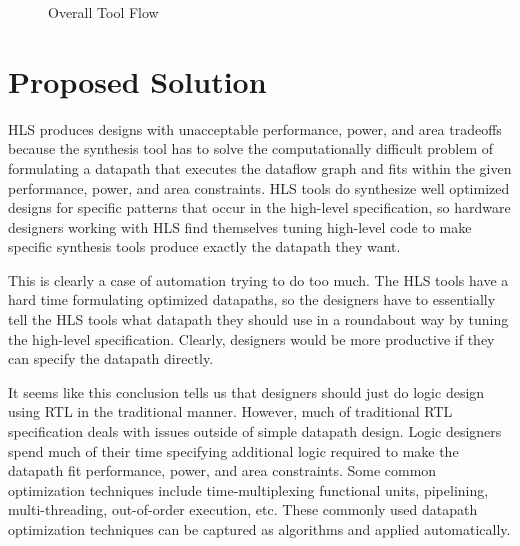\begin{figure}
	\centering
    \caption{Overall Tool Flow}
	\label{fig:workflow}
\end{figure}

\section{Proposed Solution}
HLS produces designs with unacceptable performance, power, and area tradeoffs because the synthesis tool has to solve the computationally difficult problem of formulating a datapath that executes the dataflow graph and fits within the given performance, power, and area constraints. HLS tools do synthesize well optimized designs for specific patterns that occur in the high-level specification, so hardware designers working with HLS find themselves tuning high-level code to make specific synthesis tools produce exactly the datapath they want. 

This is clearly a case of automation trying to do too much. The HLS tools have a hard time formulating optimized datapaths, so the designers have to essentially tell the HLS tools what datapath they should use in a roundabout way by tuning the high-level specification. Clearly, designers would be more productive if they can specify the datapath directly. 

It seems like this conclusion tells us that designers should just do logic design using RTL in the traditional manner. However, much of traditional RTL specification deals with issues outside of simple datapath design. Logic designers spend much of their time specifying additional logic required to make the datapath fit performance, power, and area constraints. Some common optimization techniques include time-multiplexing functional units, pipelining, multi-threading, out-of-order execution, etc. These commonly used datapath optimization techniques can be captured as algorithms and applied automatically.

